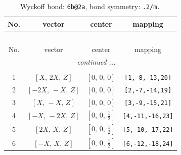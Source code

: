 \documentclass[fleqn,8pt]{jsarticle}
\begin{document}
\begin{longtable}{cccc}
\caption{Wyckoff bond: {\tt 6b@2a}, bond symmetry: {\tt .2/m.}}
 \\
 \hline \hline
No. & vector & center & mapping \\ \hline \endfirsthead

\multicolumn{3}{l}{\tablename\ \thetable{}} \\
 \hline \hline
No. & vector & center & mapping \\ \hline \endhead

 \hline \hline
\multicolumn{3}{r}{\footnotesize\it continued ...} \\ \endfoot

 \hline \hline
\multicolumn{3}{r}{} \\ \endlastfoot

1 & $\left[ X,\, 2 X,\, Z \right]$ & $\left[ 0,\, 0,\, 0 \right]$ & {\tt [1,-8,-13,20]} \\ \hline
2 & $\left[ - 2 X,\, - X,\, Z \right]$ & $\left[ 0,\, 0,\, 0 \right]$ & {\tt [2,-7,-14,19]} \\ \hline
3 & $\left[ X,\, - X,\, Z \right]$ & $\left[ 0,\, 0,\, 0 \right]$ & {\tt [3,-9,-15,21]} \\ \hline
4 & $\left[ - X,\, - 2 X,\, Z \right]$ & $\left[ 0,\, 0,\, \frac{1}{2} \right]$ & {\tt [4,-11,-16,23]} \\ \hline
5 & $\left[ 2 X,\, X,\, Z \right]$ & $\left[ 0,\, 0,\, \frac{1}{2} \right]$ & {\tt [5,-10,-17,22]} \\ \hline
6 & $\left[ - X,\, X,\, Z \right]$ & $\left[ 0,\, 0,\, \frac{1}{2} \right]$ & {\tt [6,-12,-18,24]} \\
\end{longtable}
\renewcommand{\arraystretch}{1.2}
\end{document}
